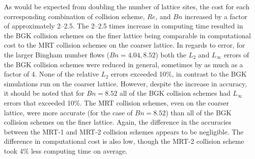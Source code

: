 As would be expected from doubling the number of lattice sites, the cost for each corresponding combination of collision scheme, $Re$, and $Bn$ increased by a factor of approximately 2--2.5.
The 2--2.5 times increase in computing time resulted in the BGK collision schemes on the finer lattice being comparable in computational cost to the MRT collision schemes on the coarser lattice.
In regards to error, for the larger Bingham number flows ($Bn = 4.04, 8.52$) both the $L_2$ and $L_\infty$ errors of the BGK collision schemes were reduced in general, sometimes by as much as a factor of 4.
None of the relative $L_2$ errors exceeded 10\%, in contrast to the BGK simulations run on the coarser lattice.
However, despite the increase in accuracy, it should be noted that for $Bn = 8.52$ all of the BGK collision schemes had $L_\infty$ errors that exceeded 10\%.
The MRT collision schemes, even on the coarser lattice, were more accurate (for the case of $Bn = 8.52$) than all of the BGK collision schemes on the finer lattice.
Again, the difference in the accuracies between the MRT-1 and MRT-2 collision schemes appears to be negligible.
The difference in computational cost is also low, though the MRT-2 collision scheme took 4\% less computing time on average.

\DIFaddbegin {}

